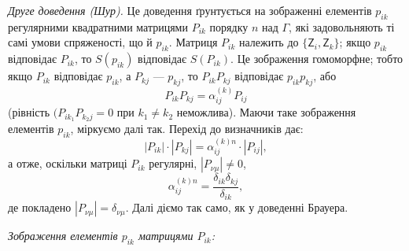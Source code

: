 \documentclass[11pt]{article}
\begin{document}
\emph{Друге доведення (Шур).} Це доведення ґрунтується на зображенні елементів \(p_{ik}\) регулярними квадратними матрицями \(P_{ik}\) порядку \(n\) над \(\Gamma\), які задовольняють ті самі умови спряженості, що й \(p_{ik}\). Матриця \(P_{ik}\) належить до \(\{\mathsf{Z}_i,\mathsf{Z}_k\}\); якщо \(p_{ik}\) відповідає \(P_{ik}\), то \(S(p_{ik})\) відповідає \(S(P_{ik})\). Це зображення гомоморфне; тобто якщо \(P_{ik}\) відповідає \(p_{ik}\), а \(P_{kj}\) --- \(p_{kj}\), то \(P_{ik}P_{kj}\) відповідає \(p_{ik}p_{kj}\), або
\[
P_{ik}P_{kj}=\alpha_{ij}^{(k)}P_{ij}
\]
(рівність \((P_{ik_1}P_{k_2j}=0\) при \(k_1\neq k_2\) неможлива). Маючи таке зображення елементів \(p_{ik}\), міркуємо далі так. Перехід до визначників дає:
\[
|P_{ik}|\cdot |P_{kj}|=\alpha_{ij}^{(k)n}\cdot |P_{ij}|,
\]
а отже, оскільки матриці \(P_{ik}\) регулярні, \(|P_{\nu\mu}|\ne0\),
\[
\alpha_{ij}^{(k)n}=\frac{\delta_{ik}\delta_{kj}}{\delta_{ik}},
\]
де покладено \(|P_{\nu\mu}|=\delta_{\nu\mu}\). Далі діємо так само, як у доведенні Брауера.

\emph{Зображення елементів \(p_{ik}\) матрицями \(P_{ik}\):}
\end{document}
